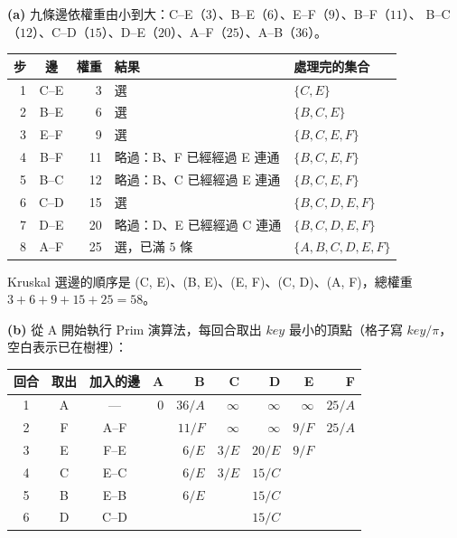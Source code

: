 \begin{pastsoln}
\textbf{(a)} 九條邊依權重由小到大：C--E（$3$）、B--E（$6$）、E--F（$9$）、B--F（$11$）、
B--C（$12$）、C--D（$15$）、D--E（$20$）、A--F（$25$）、A--B（$36$）。

\begin{center}
\small
\begin{tabular}{rcrll}
\toprule
步 & 邊 & 權重 & 結果 & 處理完的集合 \\
\midrule
1 & C--E & 3 & 選 & $\{C, E\}$ \\
2 & B--E & 6 & 選 & $\{B, C, E\}$ \\
3 & E--F & 9 & 選 & $\{B, C, E, F\}$ \\
4 & B--F & 11 & 略過：B、F 已經經過 E 連通 & $\{B, C, E, F\}$ \\
5 & B--C & 12 & 略過：B、C 已經經過 E 連通 & $\{B, C, E, F\}$ \\
6 & C--D & 15 & 選 & $\{B, C, D, E, F\}$ \\
7 & D--E & 20 & 略過：D、E 已經經過 C 連通 & $\{B, C, D, E, F\}$ \\
8 & A--F & 25 & 選，已滿 $5$ 條 & $\{A, B, C, D, E, F\}$ \\
\bottomrule
\end{tabular}
\end{center}

Kruskal 選邊的順序是 (C, E)、(B, E)、(E, F)、(C, D)、(A, F)，總權重
$3 + 6 + 9 + 15 + 25 = 58$。

\textbf{(b)} 從 A 開始執行 Prim 演算法，每回合取出 $\mathit{key}$ 最小的頂點（格子寫
$\mathit{key}/\pi$，空白表示已在樹裡）：

\begin{center}
\small
\begin{tabular}{cccrrrrrr}
\toprule
回合 & 取出 & 加入的邊 & A & B & C & D & E & F \\
\midrule
1 & A & — & $0$ & $36/A$ & $\infty$ & $\infty$ & $\infty$ & $25/A$ \\
2 & F & A--F & & $11/F$ & $\infty$ & $\infty$ & $9/F$ & $25/A$ \\
3 & E & F--E & & $6/E$ & $3/E$ & $20/E$ & $9/F$ & \\
4 & C & E--C & & $6/E$ & $3/E$ & $15/C$ & & \\
5 & B & E--B & & $6/E$ & & $15/C$ & & \\
6 & D & C--D & & & & $15/C$ & & \\
\bottomrule
\end{tabular}
\end{center}


\end{pastsoln}
